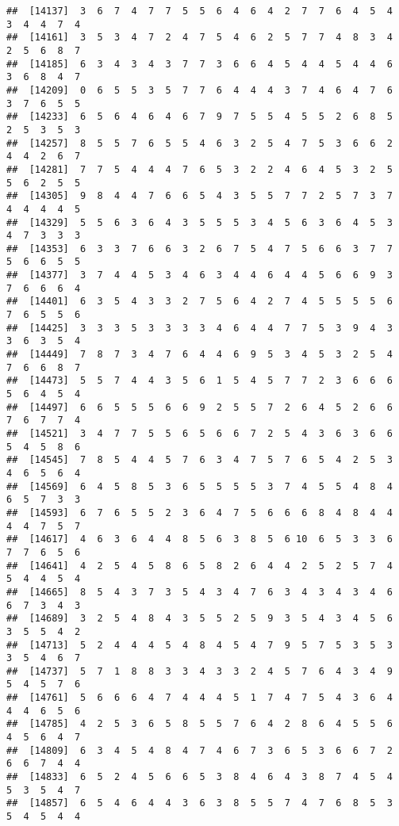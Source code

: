 \documentclass[
]{book}
\begin{document}
\begin{verbatim}
##  [14137]  3  6  7  4  7  7  5  5  6  4  6  4  2  7  7  6  4  5  4  3  4  4  7  4
##  [14161]  3  5  3  4  7  2  4  7  5  4  6  2  5  7  7  4  8  3  4  2  5  6  8  7
##  [14185]  6  3  4  3  4  3  7  7  3  6  6  4  5  4  4  5  4  4  6  3  6  8  4  7
##  [14209]  0  6  5  5  3  5  7  7  6  4  4  4  3  7  4  6  4  7  6  3  7  6  5  5
##  [14233]  6  5  6  4  6  4  6  7  9  7  5  5  4  5  5  2  6  8  5  2  5  3  5  3
##  [14257]  8  5  5  7  6  5  5  4  6  3  2  5  4  7  5  3  6  6  2  4  4  2  6  7
##  [14281]  7  7  5  4  4  4  7  6  5  3  2  2  4  6  4  5  3  2  5  5  6  2  5  5
##  [14305]  9  8  4  4  7  6  6  5  4  3  5  5  7  7  2  5  7  3  7  4  4  4  4  5
##  [14329]  5  5  6  3  6  4  3  5  5  5  3  4  5  6  3  6  4  5  3  4  7  3  3  3
##  [14353]  6  3  3  7  6  6  3  2  6  7  5  4  7  5  6  6  3  7  7  5  6  6  5  5
##  [14377]  3  7  4  4  5  3  4  6  3  4  4  6  4  4  5  6  6  9  3  7  6  6  6  4
##  [14401]  6  3  5  4  3  3  2  7  5  6  4  2  7  4  5  5  5  5  6  7  6  5  5  6
##  [14425]  3  3  3  5  3  3  3  3  4  6  4  4  7  7  5  3  9  4  3  3  6  3  5  4
##  [14449]  7  8  7  3  4  7  6  4  4  6  9  5  3  4  5  3  2  5  4  7  6  6  8  7
##  [14473]  5  5  7  4  4  3  5  6  1  5  4  5  7  7  2  3  6  6  6  5  6  4  5  4
##  [14497]  6  6  5  5  5  6  6  9  2  5  5  7  2  6  4  5  2  6  6  7  6  7  7  4
##  [14521]  3  4  7  7  5  5  6  5  6  6  7  2  5  4  3  6  3  6  6  5  4  5  8  6
##  [14545]  7  8  5  4  4  5  7  6  3  4  7  5  7  6  5  4  2  5  3  4  6  5  6  4
##  [14569]  6  4  5  8  5  3  6  5  5  5  5  3  7  4  5  5  4  8  4  6  5  7  3  3
##  [14593]  6  7  6  5  5  2  3  6  4  7  5  6  6  6  8  4  8  4  4  4  4  7  5  7
##  [14617]  4  6  3  6  4  4  8  5  6  3  8  5  6 10  6  5  3  3  6  7  7  6  5  6
##  [14641]  4  2  5  4  5  8  6  5  8  2  6  4  4  2  5  2  5  7  4  5  4  4  5  4
##  [14665]  8  5  4  3  7  3  5  4  3  4  7  6  3  4  3  4  3  4  6  6  7  3  4  3
##  [14689]  3  2  5  4  8  4  3  5  5  2  5  9  3  5  4  3  4  5  6  3  5  5  4  2
##  [14713]  5  2  4  4  4  5  4  8  4  5  4  7  9  5  7  5  3  5  3  3  5  4  6  7
##  [14737]  5  7  1  8  8  3  3  4  3  3  2  4  5  7  6  4  3  4  9  5  4  5  7  6
##  [14761]  5  6  6  6  4  7  4  4  4  5  1  7  4  7  5  4  3  6  4  4  4  6  5  6
##  [14785]  4  2  5  3  6  5  8  5  5  7  6  4  2  8  6  4  5  5  6  4  5  6  4  7
##  [14809]  6  3  4  5  4  8  4  7  4  6  7  3  6  5  3  6  6  7  2  6  6  7  4  4
##  [14833]  6  5  2  4  5  6  6  5  3  8  4  6  4  3  8  7  4  5  4  5  3  5  4  7
##  [14857]  6  5  4  6  4  4  3  6  3  8  5  5  7  4  7  6  8  5  3  5  4  5  4  4

\end{verbatim}
\end{document}
